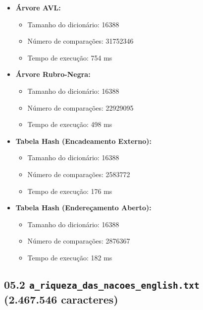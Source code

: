 \documentclass{article}
\begin{document}
\begin{itemize}
    \item \textbf{Árvore AVL:}
    \begin{itemize}
        \item Tamanho do dicionário: 16388
        \item Número de comparações: 31752346
        \item Tempo de execução: 754 ms
    \end{itemize}
    
    \item \textbf{Árvore Rubro-Negra:}
    \begin{itemize}
        \item Tamanho do dicionário: 16388
        \item Número de comparações: 22929095
        \item Tempo de execução: 498 ms
    \end{itemize}
    
    \item \textbf{Tabela Hash (Encadeamento Externo):}
    \begin{itemize}
        \item Tamanho do dicionário: 16388
        \item Número de comparações: 2583772
        \item Tempo de execução: 176 ms
    \end{itemize}
    
    \item \textbf{Tabela Hash (Endereçamento Aberto):}
    \begin{itemize}
        \item Tamanho do dicionário: 16388
        \item Número de comparações: 2876367
        \item Tempo de execução: 182 ms
    \end{itemize}
\end{itemize}

\subsection*{05.2 \texttt{a\_riqueza\_das\_nacoes\_english.txt} (2.467.546 caracteres)}
\end{document}
